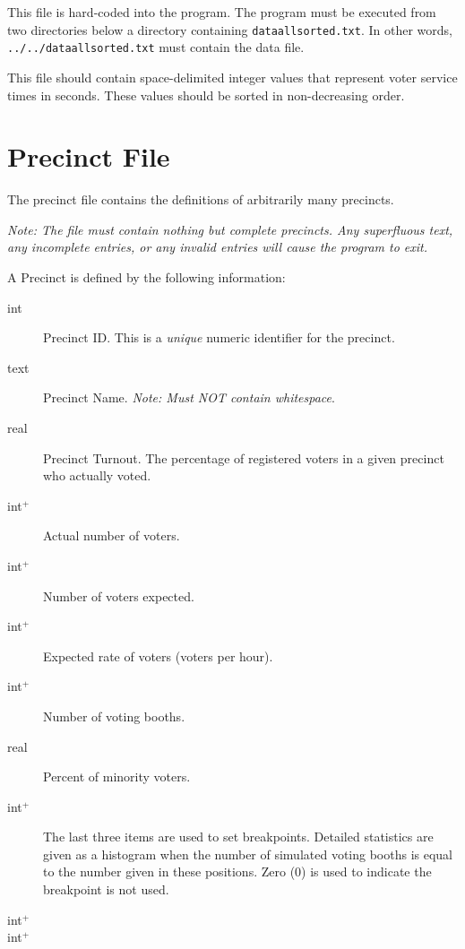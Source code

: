 This file is hard-coded into the program. The program must be executed from two directories below a directory containing \texttt{dataallsorted.txt}. In other words, \texttt{../../dataallsorted.txt} must contain the data file.

This file should contain space-delimited integer values that represent voter service times in seconds. These values should be sorted in non-decreasing order.

\section{Precinct File} \label{hxtk-pct-file}

The precinct file contains the definitions of arbitrarily many precincts.

\vspace{0.5cm}

\emph{Note: The file must contain nothing but complete precincts. Any superfluous text, any incomplete entries, or any invalid entries will cause the program to exit.}

\vspace{0.5cm}

A Precinct is defined by the following information:

\begin{description}
\item[int] Precinct ID. This is a \emph{unique} numeric identifier for the precinct.
\item[text] Precinct Name. \emph{Note: Must NOT contain whitespace}.
\item[real] Precinct Turnout. The percentage of registered voters in a given precinct who actually voted.
\item[int$^+$] Actual number of voters.
\item[int$^+$] Number of voters expected.
\item[int$^+$] Expected rate of voters (voters per hour).
\item[int$^+$] Number of voting booths.
\item[real] Percent of minority voters.


\item[int$^+$] The last three items are used to set breakpoints. Detailed statistics are given as a histogram when the number of simulated voting booths is equal to the number given in these positions. Zero (0) is used to indicate the breakpoint is not used.
\item[int$^+$] 
\item[int$^+$] 
\end{description}

